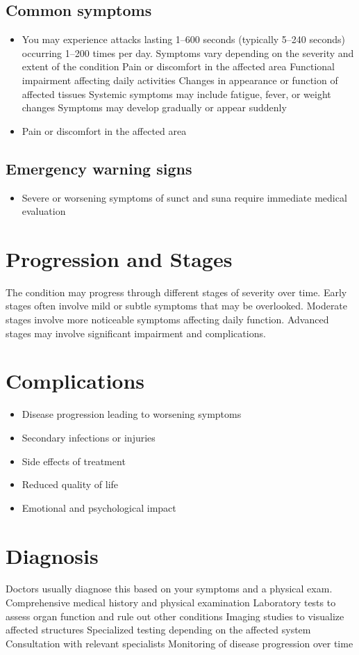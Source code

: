 \subsection{Common symptoms}
\begin{itemize}[noitemsep]
  \item You may experience attacks lasting 1--600 seconds (typically 5--240 seconds) occurring 1--200 times per day. Symptoms vary depending on the severity and extent of the condition Pain or discomfort in the affected area Functional impairment affecting daily activities Changes in appearance or function of affected tissues Systemic symptoms may include fatigue, fever, or weight changes Symptoms may develop gradually or appear suddenly
  \item Pain or discomfort in the affected area
  \end{itemize}

\subsection{Emergency warning signs}
\begin{itemize}[noitemsep]
  \item Severe or worsening symptoms of sunct and suna require immediate medical evaluation
\end{itemize}
\section{Progression and Stages}
The condition may progress through different stages of severity over time. Early stages often involve mild or subtle symptoms that may be overlooked. Moderate stages involve more noticeable symptoms affecting daily function. Advanced stages may involve significant impairment and complications.
\section{Complications}
\begin{itemize}[noitemsep]
  \item Disease progression leading to worsening symptoms
  \item Secondary infections or injuries
  \item Side effects of treatment
  \item Reduced quality of life
  \item Emotional and psychological impact
\end{itemize}
\section{Diagnosis}
Doctors usually diagnose this based on your symptoms and a physical exam. Comprehensive medical history and physical examination Laboratory tests to assess organ function and rule out other conditions Imaging studies to visualize affected structures Specialized testing depending on the affected system Consultation with relevant specialists Monitoring of disease progression over time

